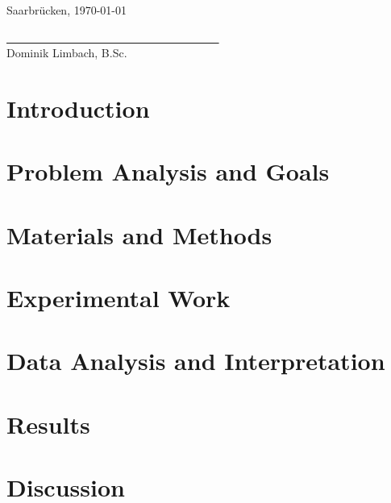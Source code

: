 \documentclass[
    12pt,
    a4paper,
	chapterprefix=false,
	parskip=full,
	headings=normal,
	numbers=noenddot
]{scrreprt}
\begin{document}
\vspace{1cm}

Saarbrücken, \today\\

\vspace{1.5cm}

\underline{~ ~ ~ ~ ~ ~ ~ ~ ~ ~ ~ ~ ~ ~ ~ ~ ~ ~ ~ ~ ~ ~ ~}\\
\small
Dominik Limbach, B.Sc.
\normalsize

\newpage

\renewcommand{\contentsname}{Contents}
\hypersetup{linkcolor=black}
\tableofcontents
\hypersetup{linkcolor=darkblue}

\newpage


\chapter{Introduction}




\chapter{Problem Analysis and Goals}




\chapter{Materials and Methods}



\chapter{Experimental Work}



\chapter{Data Analysis and Interpretation}



\chapter{Results}




\chapter{Discussion}
\end{document}
